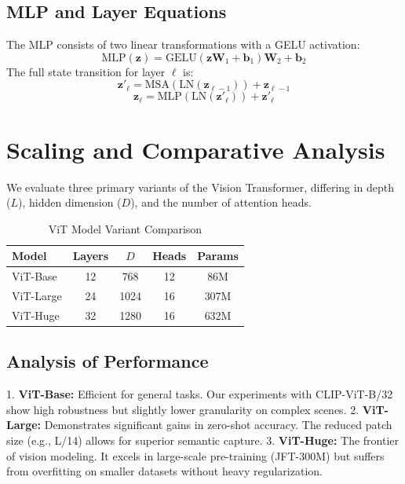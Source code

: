 \documentclass[twocolumn,10pt]{article}
\begin{document}
\subsection{MLP and Layer Equations}
The MLP consists of two linear transformations with a GELU activation:
\begin{equation}
\text{MLP}(\mathbf{z}) = \text{GELU}(\mathbf{z}\mathbf{W}_1 + \mathbf{b}_1)\mathbf{W}_2 + \mathbf{b}_2
\end{equation}
The full state transition for layer $\ell$ is:
\begin{equation}
\mathbf{z}'_\ell = \text{MSA}(\text{LN}(\mathbf{z}_{\ell-1})) + \mathbf{z}_{\ell-1}
\end{equation}
\begin{equation}
\mathbf{z}_\ell = \text{MLP}(\text{LN}(\mathbf{z}'_\ell)) + \mathbf{z}'_\ell
\end{equation}

\section{Scaling and Comparative Analysis}
We evaluate three primary variants of the Vision Transformer, differing in depth ($L$), hidden dimension ($D$), and the number of attention heads.

\begin{table}[h]
\centering
\caption{ViT Model Variant Comparison}
\begin{tabular}{lcccc}
\toprule
Model & Layers & $D$ & Heads & Params \\
\midrule
ViT-Base & 12 & 768 & 12 & 86M \\
ViT-Large & 24 & 1024 & 16 & 307M \\
ViT-Huge & 32 & 1280 & 16 & 632M \\
\bottomrule
\end{tabular}
\end{table}

\subsection{Analysis of Performance}
1. \textbf{ViT-Base:} Efficient for general tasks. Our experiments with CLIP-ViT-B/32 show high robustness but slightly lower granularity on complex scenes.
2. \textbf{ViT-Large:} Demonstrates significant gains in zero-shot accuracy. The reduced patch size (e.g., L/14) allows for superior semantic capture.
3. \textbf{ViT-Huge:} The frontier of vision modeling. It excels in large-scale pre-training (JFT-300M) but suffers from overfitting on smaller datasets without heavy regularization.
\end{document}
